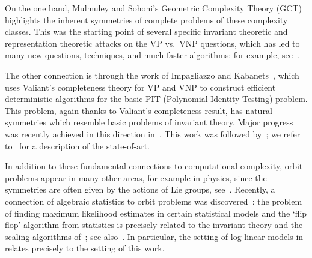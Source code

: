 \documentclass[a4paper,USenglish,cleveref,numberwithinsect]{lipics-v2021}
\numberwithin{equation}{section}
\begin{document}
On the one hand,
Mulmuley and Sohoni's Geometric Complexity Theory (GCT)~\cite{mulmuley2001geometric}
highlights the inherent symmetries of complete problems of these complexity classes.
This was the starting point of several specific invariant theoretic and
representation theoretic attacks on the VP vs.~VNP questions, which has led
to many new questions, techniques, and much faster algorithms:
for example, see~\cite{GCTV,FS,BCMW:17,MW19}.

The other connection is through
the work of Impagliazzo and Kabanets~\cite{KI04},
which uses Valiant's completeness theory for VP and VNP
to construct efficient deterministic algorithms
for the basic PIT (Polynomial Identity Testing) problem.
This problem, again thanks to Valiant's completeness result, has natural symmetries
which resemble basic problems of invariant theory.
Major progress was recently achieved in this direction in~\cite{Gur04,GGOW16,IQS,IQS2,DM-poly}.
This work was followed by~\cite{DM-oc, hamada-hirai, ivanyos-qiao,GGOW:20,BGOWW,BFGOWW,BLNW:20,BFGOWW2};
we refer to~\cite{BFGOWW2} for a description of the state-of-art.

In addition to these fundamental connections to computational complexity, orbit problems appear in many other areas,
for example in physics, since the symmetries are often given by the actions of Lie groups,
see~\cite{audin2012torus, marsdenweinstein, symplectic-in-physics}.
Recently, a connection of algebraic statistics to orbit problems was discovered~\cite{AKRS:21b,amendola2021toric}:
the problem of finding maximum likelihood estimates in certain statistical models and the `flip flop' algorithm from
statistics is precisely related to the invariant theory and the scaling algorithms of~\cite{GGOW16,BGOWW}; see also~\cite{franks2021near,derksen2021maximum,derksen2022maximum}.
In particular, the setting of log-linear models in~\cite{amendola2021toric} relates precisely to the setting of this work.

\end{document}
